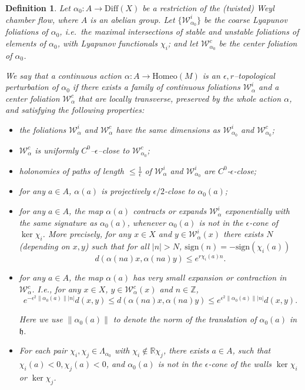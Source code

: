 \documentclass[11pt]{amsart}
\numberwithin{equation}{section}
\newcommand{\R}{\mathbb{R}}
\newcommand{\Z}{\mathbb{Z}}
\newcommand{\W}{\mathcal{W}}
\theoremstyle{plain}
\newtheorem{defi}{Definition}[section]
\begin{document}
\begin{defi}\label{topper}
Let $\alpha_0: A \to \mathrm{Diff}(X)$ be a restriction of the (twisted)
Weyl chamber flow, where $A$ is an abelian group. Let $\{\mathcal W^i_{\alpha_0}\}$ be the coarse Lyapunov
foliations of $\alpha_0$, i.e.\ the maximal intersections of stable and
unstable foliations of elements of $\alpha_0$, with Lyapunov functionals $\chi_i$; and let $\mathcal W^c_{\alpha_0}$
be the center foliation of $\alpha_0$.

We say that a continuous action $\alpha:A \to \mathrm{Homeo}(M)$ is an
$\epsilon,r$–\emph{topological perturbation} of $\alpha_0$ if there exists
a family of continuous foliations $\mathcal W^i_\alpha$ and a center
foliation $\mathcal W^c_\alpha$ that are locally transverse,
preserved by the whole action $\alpha$, and satisfying the following properties:
\begin{itemize}
\item the foliations $\mathcal W^i_\alpha$ and $\mathcal W^c_\alpha$ have
  the same dimensions as $\mathcal W^i_{\alpha_0}$ and $\mathcal W^c_{\alpha_0}$;
  
  \item $\W^c_\alpha$ is uniformly $C^0$–$\epsilon$–close to $\mathcal W^c_{\alpha_0}$;

  \item holonomies of paths of length $\le \frac{1}{\epsilon}$ of $\W^i_\alpha$ and  $\mathcal W^i_{\alpha_0}$ are $C^0$-$\epsilon$-close;

   \item for any $a\in A$, $\alpha(a)$ is projectively $\epsilon/2$-close to $\alpha_0(a)$;

\item for any $a\in A$, the map $\alpha(a)$ contracts or expands
  $\mathcal W^i_\alpha$ exponentially with the same signature as
  $\alpha_0(a)$, whenever $\alpha_0(a)$ is not in the $\epsilon$-cone of $\ker \chi_i$. More precisely, for any $x\in X$ and
  $y\in\mathcal W^i_\alpha(x)$ there exists $N$ (depending on $x,y$)
  such that for all $|n|>N$, $\mathrm{sign}(n)=-\mathrm{sign} (\chi_i(a))$
  \[
    d(\alpha(na)x,\alpha(na)y)\le e^{r\chi_i(a) n}.
  \]
  


\item for any $a\in A$, the map $\alpha(a)$ has very small expansion or contraction in $\W^c_\alpha$. I.e., for any $x\in X$,
  $y\in\mathcal W^c_\alpha(x)$ and $n\in \Z$,
  \[
    e^{-\epsilon^2\|\alpha_0(a)\||n|}d(x,y)\le d(\alpha(na)x,\alpha(na)y)\le e^{\epsilon^2\|\alpha_0(a)\||n|}d(x,y).
  \] 

  Here we use $\|\alpha_0(a)\|$ to denote the norm of the translation of $\alpha_0(a)$ in $ \mathfrak h$.


\item For each pair $\chi_i,\chi_j\in \Lambda_{\alpha_0}$ with $\chi_i\not\in \R\chi_j$, there exists $a\in A$, such that $\chi_i(a)<0, \chi_j(a)<0$, and $\alpha_0(a)$ is not in the $\epsilon$-cone of the walls $\ker \chi_i$ or $\ker \chi_j$.
\end{itemize}
\end{defi}
\end{document}
